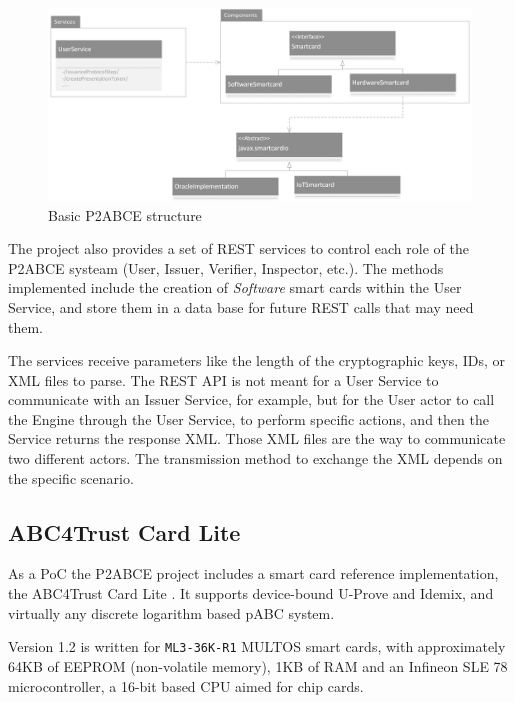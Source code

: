 \begin{figure}[bth]
	\begin{center}
		\includegraphics[width=\linewidth]{gfx/p2abceBasicUML}
	\end{center}
	\caption{Basic P2ABCE structure}
	\label{fig:p2abceBasicUML}
\end{figure}


\hfil

The project also provides a set of REST services to control each role of the P2ABCE systeam (User, Issuer, Verifier, Inspector, etc.). The methods implemented include the creation of \textit{Software} smart cards within the User Service, and store them in a data base for future REST calls that may need them.

The services receive parameters like the length of the cryptographic keys, IDs, or XML files to parse. The REST API is not meant for a User Service to communicate with an Issuer Service, for example, but for the User actor to call the Engine through the User Service, to perform specific actions, and then the Service returns the response XML. Those XML files are the way to communicate two different actors. The transmission method to exchange the XML depends on the specific scenario.



\subsection{ABC4Trust Card Lite}

As a PoC the P2ABCE project includes a smart card reference implementation, the ABC4Trust Card Lite \citep{ABC4TCardLite}. It supports device-bound U-Prove and Idemix, and virtually any discrete logarithm based pABC system.

Version 1.2 is written for \texttt{ML3-36K-R1} MULTOS smart cards, with approximately 64KB of EEPROM (non-volatile memory), 1KB of RAM and an Infineon SLE 78 microcontroller, a 16-bit based CPU aimed for chip cards.

